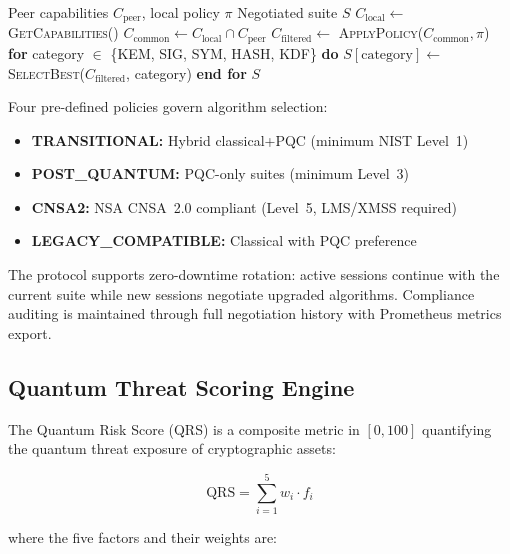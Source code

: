 \documentclass[conference,10pt]{IEEEtran}
\begin{document}
\begin{algorithm}[t]
\caption{Crypto Agility Negotiation}
\label{alg:agility}
\begin{algorithmic}[1]
\REQUIRE Peer capabilities $C_{\text{peer}}$, local policy $\pi$
\ENSURE Negotiated suite $S$
\STATE $C_{\text{local}} \leftarrow$ \textsc{GetCapabilities}()
\STATE $C_{\text{common}} \leftarrow C_{\text{local}} \cap C_{\text{peer}}$
\STATE $C_{\text{filtered}} \leftarrow$ \textsc{ApplyPolicy}($C_{\text{common}}, \pi$)
\STATE \textbf{for} category $\in$ \{KEM, SIG, SYM, HASH, KDF\} \textbf{do}
\STATE \quad $S[\text{category}] \leftarrow$ \textsc{SelectBest}($C_{\text{filtered}}$, category)
\STATE \textbf{end for}
\RETURN $S$
\end{algorithmic}
\end{algorithm}

Four pre-defined policies govern algorithm selection:

\begin{itemize}
    \item \textbf{TRANSITIONAL:} Hybrid classical+PQC (minimum NIST Level~1)
    \item \textbf{POST\_QUANTUM:} PQC-only suites (minimum Level~3)
    \item \textbf{CNSA2:} NSA CNSA~2.0 compliant (Level~5, LMS/XMSS required)
    \item \textbf{LEGACY\_COMPATIBLE:} Classical with PQC preference
\end{itemize}

The protocol supports zero-downtime rotation: active sessions continue with the current suite while new sessions negotiate upgraded algorithms. Compliance auditing is maintained through full negotiation history with Prometheus metrics export.

\subsection{Quantum Threat Scoring Engine}

The Quantum Risk Score (QRS) is a composite metric in $[0, 100]$ quantifying the quantum threat exposure of cryptographic assets:

\begin{equation}
    \text{QRS} = \sum_{i=1}^{5} w_i \cdot f_i
\end{equation}

\noindent where the five factors and their weights are:
\end{document}
